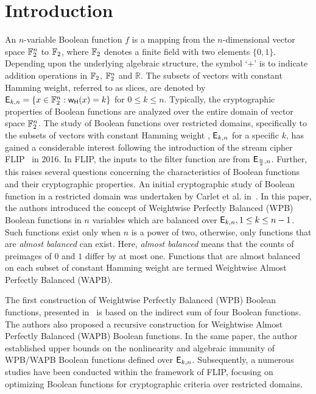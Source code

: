 \documentclass{llncs}
\begin{document}
\section{Introduction}
An $n$-variable Boolean function $f$ is a mapping from the $n$-dimensional vector space $\mathbb{F}_2^n$ to $\mathbb{F}_2$, where $\mathbb{F}_2$ denotes a finite field with two elements $\{0,1\}$. 
Depending upon the underlying algebraic structure, the symbol `$+$' is to indicate addition operations in $\mathbb{F}_2$, $\mathbb{F}_2^n$ and $\mathbb{R}$. 
The subsets of vectors with constant Hamming weight, referred to as slices, are denoted by $\mathsf{E}_{k,n} = \{x \in \mathbb{F}_2^n : \mathsf{w_H}(x)=k\}$ for $0 \leq k \leq n$.
Typically, the cryptographic properties of Boolean functions are analyzed over the entire domain of vector space $\mathbb{F}_2^n$. 
The study of Boolean functions over restricted domains, specifically to the subsets of vectors with constant Hamming weight \ie, $\mathsf{E}_{k,n}$ for a specific $k$, has gained a considerable interest following the introduction of the stream cipher FLIP~\cite{EC:MJSC16} in 2016.
In FLIP, the inputs to the filter function are from $\mathsf{E}_{\frac{n}{2},n}$. 
Further, this raises several questions concerning the characteristics of Boolean functions and their cryptographic properties. 
An initial cryptographic study of Boolean function in a restricted domain was undertaken by Carlet et al. in~\cite{TOSC:CarMeaRot17}. 
In this paper, the authors introduced the concept of Weightwise Perfectly Balanced (WPB) Boolean functions in $n$ variables which are balanced over $\mathsf{E}_{k,n}, 1 \leq k \leq n-1$. 
Such functions exist only when $n$ is a power of two,  otherwise, only functions that are \textit{almost balanced} can exist. 
Here, \textit{almost balanced} means that the counts of preimages of $0$ and $1$ differ by at most one. Functions that are almost balanced on each subset of constant Hamming weight are termed Weightwise Almost Perfectly Balanced (WAPB). 


The first construction of Weightwise Perfectly Balanced (WPB) Boolean functions, presented in~\cite{TOSC:CarMeaRot17} is based on the indirect sum of four Boolean functions. 
The authors also proposed a recursive construction for Weightwise Almost Perfectly Balanced (WAPB) Boolean functions. 
In the same paper, the author established upper bounds on the nonlinearity and algebraic immunity of WPB/WAPB Boolean functions defined over $\mathsf{E}_{k,n}$. Subsequently, a numerous studies have been conducted within the framework of FLIP, focusing on optimizing Boolean functions for cryptographic criteria over restricted domains.
\end{document}
